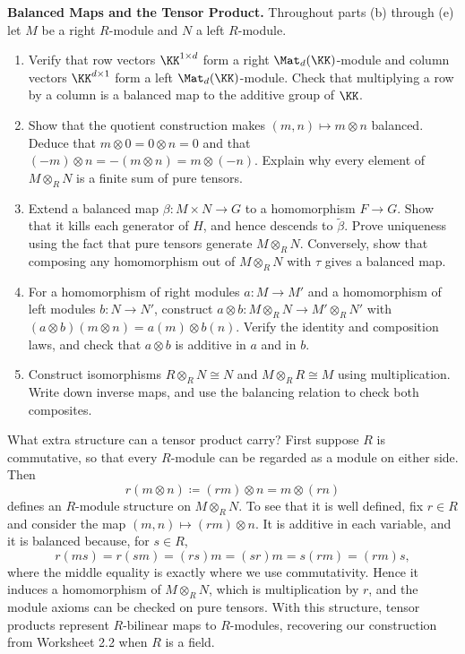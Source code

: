 \documentclass[12pt,reqno]{amsart}
\begin{document}
\begin{problems}
\item\label{t:balanced} \textbf{Balanced Maps and the Tensor Product.} Throughout parts (b) through (e) let $M$ be a right $R$-module and $N$ a left $R$-module.
\begin{enumerate}
\item Verify that row vectors $\KK^{1\times d}$ form a right $\Mat_d(\KK)$-module and column vectors $\KK^{d\times1}$ form a left $\Mat_d(\KK)$-module. Check that multiplying a row by a column is a balanced map to the additive group of $\KK$.
\item Show that the quotient construction makes $(m,n)\mapsto m\otimes n$ balanced. Deduce that $m\otimes0=0\otimes n=0$ and that $(-m)\otimes n=-(m\otimes n)=m\otimes(-n)$. Explain why every element of $M\otimes_RN$ is a finite sum of pure tensors.
\item Extend a balanced map $\beta:M\times N\to G$ to a homomorphism $F\to G$. Show that it kills each generator of $H$, and hence descends to $\widetilde\beta$. Prove uniqueness using the fact that pure tensors generate $M\otimes_RN$. Conversely, show that composing any homomorphism out of $M\otimes_RN$ with $\tau$ gives a balanced map.
\item For a homomorphism of right modules $a:M\to M'$ and a homomorphism of left modules $b:N\to N'$, construct $a\otimes b:M\otimes_RN\to M'\otimes_RN'$ with $(a\otimes b)(m\otimes n)=a(m)\otimes b(n)$. Verify the identity and composition laws, and check that $a\otimes b$ is additive in $a$ and in $b$.
\item Construct isomorphisms $R\otimes_RN\cong N$ and $M\otimes_RR\cong M$ using multiplication. Write down inverse maps, and use the balancing relation to check both composites.
\end{enumerate}
\end{problems}

\hrulefill

What extra structure can a tensor product carry? First suppose $R$ is commutative, so that every $R$-module can be regarded as a module on either side. Then
\[
r(m\otimes n)\coloneqq(rm)\otimes n=m\otimes(rn)
\]
defines an $R$-module structure on $M\otimes_RN$. To see that it is well defined, fix $r\in R$ and consider the map $(m,n)\mapsto(rm)\otimes n$. It is additive in each variable, and it is balanced because, for $s\in R$,
\[
r(ms)=r(sm)=(rs)m=(sr)m=s(rm)=(rm)s,
\]
where the middle equality is exactly where we use commutativity. Hence it induces a homomorphism of $M\otimes_RN$, which is multiplication by $r$, and the module axioms can be checked on pure tensors. With this structure, tensor products represent $R$-bilinear maps to $R$-modules, recovering our construction from Worksheet 2.2 when $R$ is a field.
\end{document}
